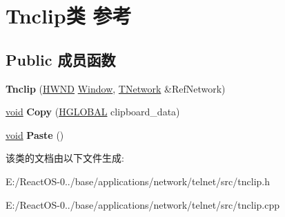 \hypertarget{class_tnclip}{}\section{Tnclip类 参考}
\label{class_tnclip}
\subsection*{Public 成员函数}
\begin{DoxyCompactItemize}
\item 
\mbox{\label{class_tnclip_ae89472c046e8c65759136df860b4b118}} 
{\bfseries Tnclip} (\hyperlink{interfacevoid}{H\+W\+ND} \hyperlink{struct_window}{Window}, \hyperlink{class_t_network}{T\+Network} \&Ref\+Network)
\item 
\mbox{\label{class_tnclip_a11603c8a6200c11546b0346c85eabfaf}} 
\hyperlink{interfacevoid}{void} {\bfseries Copy} (\hyperlink{interfacevoid}{H\+G\+L\+O\+B\+AL} clipboard\+\_\+data)
\item 
\mbox{\label{class_tnclip_abd3159c1140a261a3f3f354fbd996715}} 
\hyperlink{interfacevoid}{void} {\bfseries Paste} ()
\end{DoxyCompactItemize}


该类的文档由以下文件生成\+:\begin{DoxyCompactItemize}
\item 
E\+:/\+React\+O\+S-\/0../base/applications/network/telnet/src/tnclip.\+h\item 
E\+:/\+React\+O\+S-\/0../base/applications/network/telnet/src/tnclip.\+cpp\end{DoxyCompactItemize}
